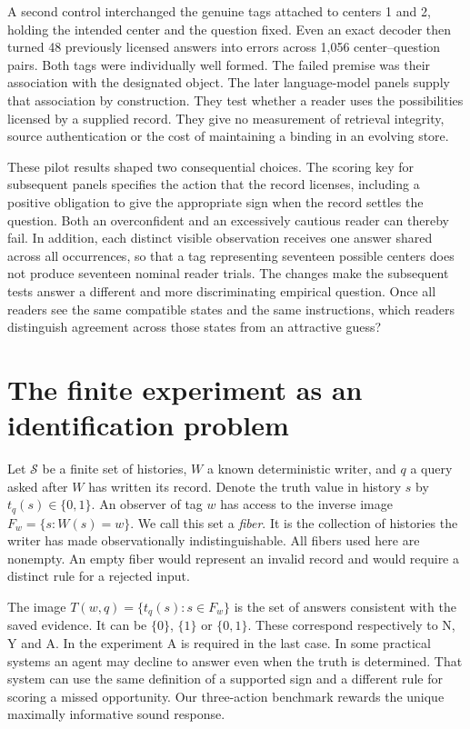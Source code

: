 \documentclass[12pt,letterpaper]{article}
\begin{document}
A second control interchanged the genuine tags attached to centers 1 and 2, holding the intended center and the question fixed. Even an exact decoder then turned 48 previously licensed answers into errors across 1,056 center--question pairs. Both tags were individually well formed. The failed premise was their association with the designated object. The later language-model panels supply that association by construction. They test whether a reader uses the possibilities licensed by a supplied record. They give no measurement of retrieval integrity, source authentication or the cost of maintaining a binding in an evolving store.

These pilot results shaped two consequential choices. The scoring key for subsequent panels specifies the action that the record licenses, including a positive obligation to give the appropriate sign when the record settles the question. Both an overconfident and an excessively cautious reader can thereby fail. In addition, each distinct visible observation receives one answer shared across all occurrences, so that a tag representing seventeen possible centers does not produce seventeen nominal reader trials. The changes make the subsequent tests answer a different and more discriminating empirical question. Once all readers see the same compatible states and the same instructions, which readers distinguish agreement across those states from an attractive guess?

\section{The finite experiment as an identification problem}\label{sec:math}
Let $\mathcal S$ be a finite set of histories, $W$ a known deterministic writer, and $q$ a query asked after $W$ has written its record. Denote the truth value in history $s$ by $t_q(s)\in\{0,1\}$. An observer of tag $w$ has access to the inverse image $F_w=\{s:W(s)=w\}$. We call this set a \emph{fiber}. It is the collection of histories the writer has made observationally indistinguishable. All fibers used here are nonempty. An empty fiber would represent an invalid record and would require a distinct rule for a rejected input.

The image $T(w,q)=\{t_q(s):s\in F_w\}$ is the set of answers consistent with the saved evidence. It can be $\{0\}$, $\{1\}$ or $\{0,1\}$. These correspond respectively to N, Y and A. In the experiment A is required in the last case. In some practical systems an agent may decline to answer even when the truth is determined. That system can use the same definition of a supported sign and a different rule for scoring a missed opportunity. Our three-action benchmark rewards the unique maximally informative sound response.
\end{document}

